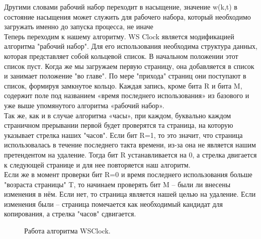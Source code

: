 Другими словами рабочий набор переходит в насыщение, значение w(k,t) в состояние насыщения может служить для рабочего набора, который необходимо загружать именно до запуска процесса, не иначе\\
Теперь переходим к нашему алгоритму. WS Clock является модификацией алгоритма "рабочий набор". Для его использования необходима структура данных, которая представляет собой кольцевой список. В начальном положении этот список пуст. Когда же мы загружаем первую страницу, она добавляется в список и занимает положение "во главе". По мере "прихода" страниц они поступают в список, формируя замкнутое кольцо. Каждая запись, кроме бита R и бита M, содержит поле под названием «время последнего использования» из базового и уже выше упомянутого  алгоритма «рабочий набор».\\
Так же, как и в случае алгоритма «часы», при каждом, буквально каждом страничном прерывании первой будет проверятся та страница, на которую указывает стрелка наших "часов". Если бит R=1, то это значит, что страница использовалась в течение последнего такта времени, из-за она не является нашим претендентом на удаление. Тогда бит R устанавливается на 0, а стрелка двигается к следующей странице и для нее повторяется наш алгоритм.\\ 
Если же в момент проверки бит R=0 и время последнего использования больше "возраста страницы" T, то начинаем проверять бит M – были ли внесены изменения в нём. Если нет, то страница является нашей целью на удаление. Если изменения были – страница помечается как необходимый кандидат для копирования, а стрелка "часов" сдвигается.\\ 

\begin{figure}[h]
\caption{Работа алгоритма WSClock.}
\end{figure}

